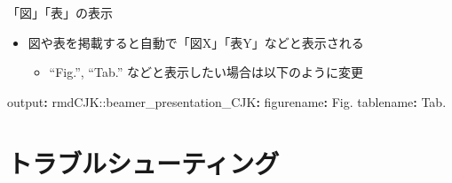 \documentclass[
  12pt,
  ignorenonframetext,
]{beamer}
\newenvironment{Shaded}{\begin{snugshade}}{\end{snugshade}}
\newcommand{\AttributeTok}[1]{\textcolor[rgb]{0.77,0.63,0.00}{#1}}
\newcommand{\FunctionTok}[1]{\textcolor[rgb]{0.00,0.00,0.00}{#1}}
\newcommand{\KeywordTok}[1]{\textcolor[rgb]{0.13,0.29,0.53}{\textbf{#1}}}
\providecommand{\tightlist}{%
  \setlength{\itemsep}{0pt}\setlength{\parskip}{0pt}}
\begin{document}
\begin{frame}[fragile]{「図」「表」の表示}
\protect\hypertarget{ux56f3ux8868ux306eux8868ux793a}{}

\begin{itemize}
\tightlist
\item
  図や表を掲載すると自動で「図X」「表Y」などと表示される

  \begin{itemize}
  \tightlist
  \item
    ``Fig.'', ``Tab.'' などと表示したい場合は以下のように変更
  \end{itemize}
\end{itemize}

\begin{Shaded}
\begin{Highlighting}[]
\FunctionTok{output}\KeywordTok{:}
\AttributeTok{  rmdCJK:}\FunctionTok{:beamer_presentation_CJK}\KeywordTok{:}
\AttributeTok{    }\FunctionTok{figurename}\KeywordTok{:}\AttributeTok{ Fig.}
\AttributeTok{    }\FunctionTok{tablename}\KeywordTok{:}\AttributeTok{ Tab.}
\end{Highlighting}
\end{Shaded}

\end{frame}

\hypertarget{ux30c8ux30e9ux30d6ux30ebux30b7ux30e5ux30fcux30c6ux30a3ux30f3ux30b0}{%
\section{トラブルシューティング}\label{ux30c8ux30e9ux30d6ux30ebux30b7ux30e5ux30fcux30c6ux30a3ux30f3ux30b0}}
\end{document}
